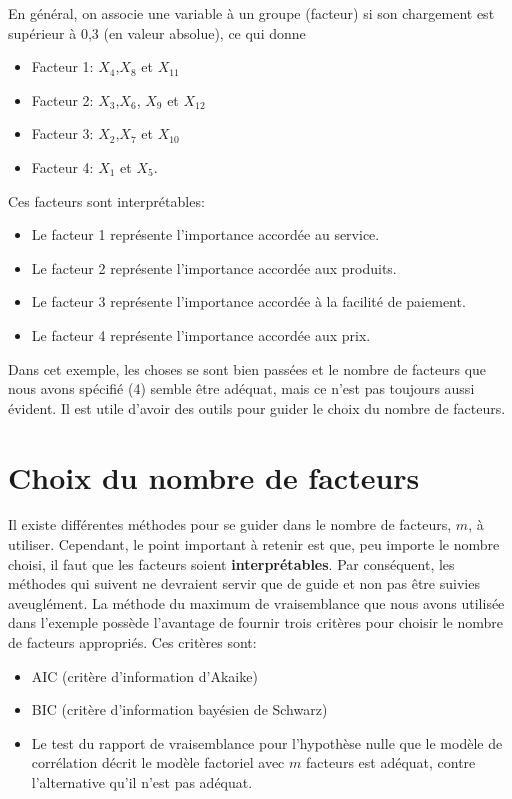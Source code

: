 \documentclass[
]{book}
\providecommand{\tightlist}{%
  \setlength{\itemsep}{0pt}\setlength{\parskip}{0pt}}
\theoremstyle{definition}
\theoremstyle{definition}
\theoremstyle{definition}
\theoremstyle{remark}
\begin{document}
En général, on associe une variable à un groupe (facteur) si son chargement est supérieur à 0,3 (en valeur absolue), ce qui donne

\begin{itemize}
\tightlist
\item
  Facteur 1: \(X_4\),\(X_8\) et \(X_{11}\)
\item
  Facteur 2: \(X_3\),\(X_6\), \(X_9\) et \(X_{12}\)
\item
  Facteur 3: \(X_2\),\(X_7\) et \(X_{10}\)
\item
  Facteur 4: \(X_1\) et \(X_5\).
\end{itemize}

Ces facteurs sont interprétables:

\begin{itemize}
\tightlist
\item
  Le facteur 1 représente l'importance accordée au service.
\item
  Le facteur 2 représente l'importance accordée aux produits.
\item
  Le facteur 3 représente l'importance accordée à la facilité de paiement.
\item
  Le facteur 4 représente l'importance accordée aux prix.
\end{itemize}

Dans cet exemple, les choses se sont bien passées et le nombre de facteurs que nous avons spécifié (4) semble être adéquat, mais ce n'est pas toujours aussi évident. Il est utile d'avoir des outils pour guider le choix du nombre de facteurs.

\hypertarget{choix-du-nombre-de-facteurs}{%
\section{Choix du nombre de facteurs}\label{choix-du-nombre-de-facteurs}}

Il existe différentes méthodes pour se guider dans le nombre de facteurs, \(m\), à utiliser. Cependant, le point important à retenir est que, peu importe le nombre choisi, il faut que les facteurs soient \textbf{interprétables}. Par conséquent, les méthodes qui
suivent ne devraient servir que de guide et non pas être suivies aveuglément.
La méthode du maximum de vraisemblance que nous avons utilisée dans l'exemple possède l'avantage de fournir trois critères pour choisir le nombre de facteurs appropriés. Ces critères sont:

\begin{itemize}
\tightlist
\item
  AIC (critère d'information d'Akaike)
\item
  BIC (critère d'information bayésien de Schwarz)
\item
  Le test du rapport de vraisemblance pour l'hypothèse nulle que le modèle de corrélation décrit le modèle factoriel avec \(m\) facteurs est adéquat, contre l'alternative qu'il n'est pas adéquat.
\end{itemize}
\end{document}
